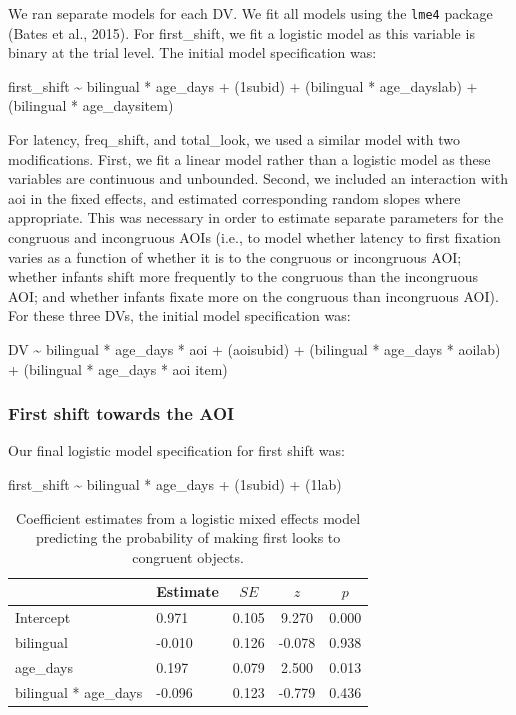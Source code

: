 \documentclass[,man,floatsintext]{apa6}
\begin{document}
We ran separate models for each DV. We fit all models using the \texttt{lme4} package (Bates et al., 2015). For first\_shift, we fit a logistic model as this variable is binary at the trial level. The initial model specification was:

first\_shift \textasciitilde{} bilingual * age\_days +
(1\textbar{}subid) +
(bilingual * age\_days\textbar{}lab) +
(bilingual * age\_days\textbar{}item)

For latency, freq\_shift, and total\_look, we used a similar model with two modifications. First, we fit a linear model rather than a logistic model as these variables are continuous and unbounded. Second, we included an interaction with aoi in the fixed effects, and estimated corresponding random slopes where appropriate. This was necessary in order to estimate separate parameters for the congruous and incongruous AOIs (i.e., to model whether latency to first fixation varies as a function of whether it is to the congruous or incongruous AOI; whether infants shift more frequently to the congruous than the incongruous AOI; and whether infants fixate more on the congruous than incongruous AOI). For these three DVs, the initial model specification was:

DV \textasciitilde{} bilingual * age\_days * aoi +
(aoi\textbar{}subid) +
(bilingual * age\_days * aoi\textbar{}lab) +
(bilingual * age\_days * aoi \textbar{}item)

\hypertarget{first-shift-towards-the-aoi}{%
\subsubsection{First shift towards the AOI}\label{first-shift-towards-the-aoi}}

Our final logistic model specification for first shift was:

first\_shift \textasciitilde{} bilingual * age\_days +
(1\textbar{}subid) +
(1\textbar{}lab)

\begin{table}[tbp]
\begin{center}
\begin{threeparttable}
\caption{\label{tab:coef_table_firstshift}Coefficient estimates from a logistic mixed effects model predicting the probability of making first looks to congruent objects.}
\begin{tabular}{llccc}
\toprule
 & Estimate & $SE$ & $z$ & $p$\\
\midrule
Intercept & 0.971 & 0.105 & 9.270 & 0.000\\
bilingual & -0.010 & 0.126 & -0.078 & 0.938\\
age\_days & 0.197 & 0.079 & 2.500 & 0.013\\
bilingual * age\_days & -0.096 & 0.123 & -0.779 & 0.436\\
\bottomrule
\end{tabular}
\end{threeparttable}
\end{center}
\end{table}
\end{document}

